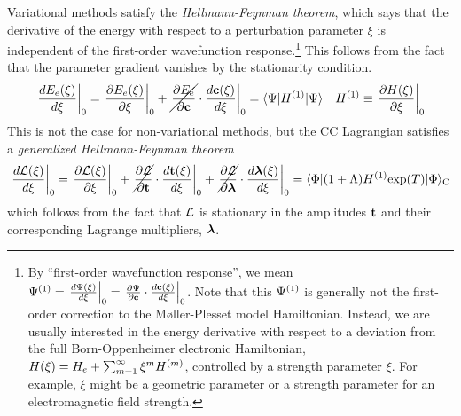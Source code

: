 \documentclass[11pt]{article}
\numberwithin{equation}{section}
\begin{document}
\begin{samepage}
\begin{rmk}
Variational methods satisfy the \textit{Hellmann-Feynman theorem}, which says that the derivative of the energy with respect to a perturbation parameter $\xi$ is independent of the first-order wavefunction response.\footnote{By ``first-order wavefunction response'', we mean $\Y\ord{1}=\left.\fd{\Y(\xi)}{\xi}\right|_0=\left.\pd{\Y}{\bo{c}}\cdot\fd{\bo{c}(\xi)}{\xi}\right|_0$.  Note that this $\Psi ^{(1)}$ is generally not the first-order correction to the M\o ller-Plesset model Hamiltonian.
Instead, we are usually interested in the energy derivative with respect to a deviation from the full Born-Oppenheimer electronic Hamiltonian, $H(\xi)=H_e+\sum_{m=1}^{\infty} \xi^m H\ord{m}$, controlled by a strength parameter $\xi$.  For example, $\xi$ might be a geometric parameter or a strength parameter for an electromagnetic field strength.}
This follows from the fact that the parameter gradient vanishes by the stationarity condition.
\begin{align}
  \left.
  \fd{E_e(\xi)}{\xi}
  \right|_0
=
  \left.
  \pd{E_e(\xi)}{\xi}
  \right|_0
+
  \left.
  \cancel{
  \pd{E_e}{\bo{c}}
  }
  \cdot
  \fd{\bo{c}(\xi)}{\xi}
  \right|_0
=
  \ip{\Y|
  H\ord{1}
  |\Y}
&&
  H\ord{1}
\equiv
  \left.
  \pd{H(\xi)}{\xi}
  \right|_0
\end{align}
This is not the case for non-variational methods, but the CC Lagrangian satisfies a
\textit{generalized Hellmann-Feynman theorem}
\begin{align}
  \left.
  \fd{\mc{L}(\xi)}{\xi}
  \right|_0
=
  \left.
  \pd{\mc{L}(\xi)}{\xi}
  \right|_0
+
  \left.
  \cancel{
  \pd{\mc{L}}{\bo{t}}
  }
  \cdot
  \fd{\bo{t}(\xi)}{\xi}
  \right|_0
+
  \left.
  \cancel{
  \pd{\mc{L}}{\bm{\la}}
  }
  \cdot
  \fd{\bm{\la}(\xi)}{\xi}
  \right|_0
=
  \ip{\F|
    (
      1
    +
      \La
    )
    H\ord{1}
    \mr{exp}(T)
  |\F}_\mr{C}
\end{align}
which follows from the fact that
$\mathcal{L}$ is stationary in the amplitudes $\mathbf{t}$ and their corresponding Lagrange multipliers, $\bm{\la}$.
\end{rmk}
\end{samepage}
\end{document}
